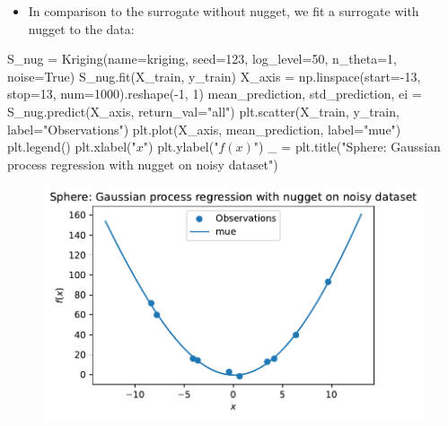 \documentclass[
  letterpaper,
  DIV=11,
  numbers=noendperiod]{scrreprt}
\newenvironment{Shaded}{\begin{snugshade}}{\end{snugshade}}
\newcommand{\DecValTok}[1]{\textcolor[rgb]{0.68,0.00,0.00}{#1}}
\newcommand{\NormalTok}[1]{\textcolor[rgb]{0.00,0.23,0.31}{#1}}
\newcommand{\OperatorTok}[1]{\textcolor[rgb]{0.37,0.37,0.37}{#1}}
\newcommand{\StringTok}[1]{\textcolor[rgb]{0.13,0.47,0.30}{#1}}
\newcommand{\VariableTok}[1]{\textcolor[rgb]{0.07,0.07,0.07}{#1}}
\providecommand{\tightlist}{%
  \setlength{\itemsep}{0pt}\setlength{\parskip}{0pt}}\usepackage{longtable,booktabs,array}
\begin{document}
\begin{itemize}
\tightlist
\item
  In comparison to the surrogate without nugget, we fit a surrogate with
  nugget to the data:
\end{itemize}

\begin{Shaded}
\begin{Highlighting}[]
\NormalTok{S\_nug }\OperatorTok{=}\NormalTok{ Kriging(name}\OperatorTok{=}\StringTok{\textquotesingle{}kriging\textquotesingle{}}\NormalTok{,}
\NormalTok{            seed}\OperatorTok{=}\DecValTok{123}\NormalTok{,}
\NormalTok{            log\_level}\OperatorTok{=}\DecValTok{50}\NormalTok{,}
\NormalTok{            n\_theta}\OperatorTok{=}\DecValTok{1}\NormalTok{,}
\NormalTok{            noise}\OperatorTok{=}\VariableTok{True}\NormalTok{)}
\NormalTok{S\_nug.fit(X\_train, y\_train)}
\NormalTok{X\_axis }\OperatorTok{=}\NormalTok{ np.linspace(start}\OperatorTok{={-}}\DecValTok{13}\NormalTok{, stop}\OperatorTok{=}\DecValTok{13}\NormalTok{, num}\OperatorTok{=}\DecValTok{1000}\NormalTok{).reshape(}\OperatorTok{{-}}\DecValTok{1}\NormalTok{, }\DecValTok{1}\NormalTok{)}
\NormalTok{mean\_prediction, std\_prediction, ei }\OperatorTok{=}\NormalTok{ S\_nug.predict(X\_axis, return\_val}\OperatorTok{=}\StringTok{"all"}\NormalTok{)}
\NormalTok{plt.scatter(X\_train, y\_train, label}\OperatorTok{=}\StringTok{"Observations"}\NormalTok{)}
\NormalTok{plt.plot(X\_axis, mean\_prediction, label}\OperatorTok{=}\StringTok{"mue"}\NormalTok{)}
\NormalTok{plt.legend()}
\NormalTok{plt.xlabel(}\StringTok{"$x$"}\NormalTok{)}
\NormalTok{plt.ylabel(}\StringTok{"$f(x)$"}\NormalTok{)}
\NormalTok{\_ }\OperatorTok{=}\NormalTok{ plt.title(}\StringTok{"Sphere: Gaussian process regression with nugget on noisy dataset"}\NormalTok{)}
\end{Highlighting}
\end{Shaded}

\begin{figure}[H]

{\centering \includegraphics{08_spot_noisy_files/figure-pdf/cell-11-output-1.pdf}

}

\end{figure}
\end{document}
